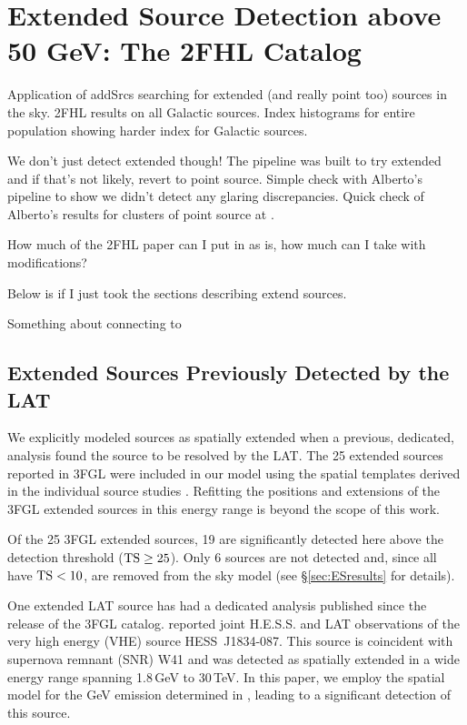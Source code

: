 \chapter{Extended Source Detection above 50 GeV: The 2FHL Catalog}
\label{chap:2FHL}

Application of addSrcs searching for extended (and really point too) sources in the sky. 2FHL results on all Galactic sources. Index histograms for entire \twofhl population showing harder index for Galactic sources.

We don't just detect extended though! The pipeline was built to try extended and if that's not likely, revert to point source. Simple check with Alberto's pipeline to show we didn't detect any glaring discrepancies. Quick check of Alberto's results for clusters of point source at \blat.

How much of the 2FHL paper can I put in as is, how much can I take with modifications?

Below is if I just took the sections describing extend sources. 

Something about connecting to \tev{}
\section{\label{sec:3FGL_ES}Extended Sources Previously Detected by the LAT}
We explicitly modeled sources as spatially extended when a previous, dedicated, analysis found the source to be resolved by the LAT.
The 25 extended sources reported in 3FGL were included in our model using the spatial templates derived in the individual source studies \citep[see references in ][]{3FGL}. Refitting the positions and extensions of the 3FGL extended sources in this energy range is beyond the scope of this work.

Of the 25 3FGL extended sources, 19 are significantly detected here above the detection threshold (${\rm TS}\geq25$). Only 6 sources are not detected and, since all have  ${\rm TS<10}$, are removed from the sky model (see \S\ref{sec:ESresults} for details).

One extended LAT source has had a dedicated analysis published since the release of the 3FGL catalog. \cite{HESSLATW41} reported joint H.E.S.S. and LAT observations of the very high energy (VHE) source HESS~J1834-087. This source is coincident with supernova remnant (SNR) W41 and was detected  as spatially extended in a wide energy range spanning 1.8\,GeV to 30\,TeV. In this paper, we employ the spatial model for the GeV emission determined in \cite{HESSLATW41}, leading to a significant detection of this source.


